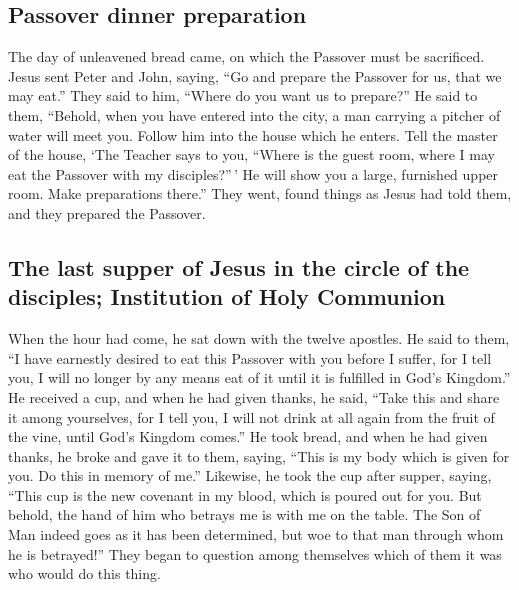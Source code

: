 \hypertarget{passover-dinner-preparation}{%
\subsection{Passover dinner
preparation}\label{passover-dinner-preparation}}

 The day of unleavened bread came, on which the Passover
must be sacrificed.  Jesus sent Peter and John, saying,
``Go and prepare the Passover for us, that we may eat.'' 
They said to him, ``Where do you want us to prepare?'' 
He said to them, ``Behold, when you have entered into the city, a man
carrying a pitcher of water will meet you. Follow him into the house
which he enters.  Tell the master of the house, `The
Teacher says to you, ``Where is the guest room, where I may eat the
Passover with my disciples?''\,'  He will show you a
large, furnished upper room. Make preparations there.'' 
They went, found things as Jesus had told them, and they prepared the
Passover.

\hypertarget{the-last-supper-of-jesus-in-the-circle-of-the-disciples-institution-of-holy-communion}{%
\subsection{The last supper of Jesus in the circle of the disciples;
Institution of Holy
Communion}\label{the-last-supper-of-jesus-in-the-circle-of-the-disciples-institution-of-holy-communion}}

 When the hour had come, he sat down with the twelve
apostles.  He said to them, ``I have earnestly desired to
eat this Passover with you before I suffer,  for I tell
you, I will no longer by any means eat of it until it is fulfilled in
God's Kingdom.''  He received a cup, and when he had
given thanks, he said, ``Take this and share it among yourselves,
 for I tell you, I will not drink at all again from the
fruit of the vine, until God's Kingdom comes.''  He took
bread, and when he had given thanks, he broke and gave it to them,
saying, ``This is my body which is given for you. Do this in memory of
me.''  Likewise, he took the cup after supper, saying,
``This cup is the new covenant in my blood, which is poured out for you.
 But behold, the hand of him who betrays me is with me on
the table.  The Son of Man indeed goes as it has been
determined, but woe to that man through whom he is betrayed!''
 They began to question among themselves which of them it
was who would do this thing.

